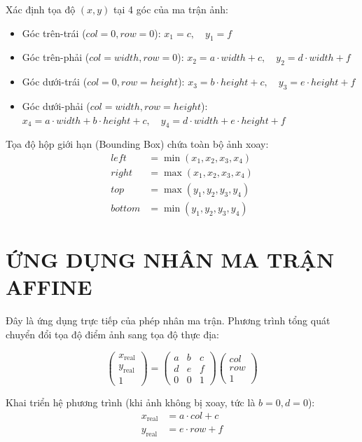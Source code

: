 \documentclass[12pt,a4paper]{report}
\begin{document}
Xác định tọa độ $(x, y)$ tại 4 góc của ma trận ảnh:
\begin{itemize}
    \item Góc trên-trái ($col=0, row=0$): $x_1 = c, \quad y_1 = f$
    \item Góc trên-phải ($col=width, row=0$): $x_2 = a \cdot width + c, \quad y_2 = d \cdot width + f$
    \item Góc dưới-trái ($col=0, row=height$): $x_3 = b \cdot height + c, \quad y_3 = e \cdot height + f$
    \item Góc dưới-phải ($col=width, row=height$): $x_4 = a \cdot width + b \cdot height + c, \quad y_4 = d \cdot width + e \cdot height + f$
\end{itemize}

Tọa độ hộp giới hạn (Bounding Box) chứa toàn bộ ảnh xoay:
\begin{align*}
    left &= \min(x_1, x_2, x_3, x_4) \\
    right &= \max(x_1, x_2, x_3, x_4) \\
    top &= \max(y_1, y_2, y_3, y_4) \\
    bottom &= \min(y_1, y_2, y_3, y_4)
\end{align*}

\section{ỨNG DỤNG NHÂN MA TRẬN AFFINE}

Đây là ứng dụng trực tiếp của phép nhân ma trận. Phương trình tổng quát chuyển đổi tọa độ điểm ảnh sang tọa độ thực địa:

\begin{equation*}
\begin{pmatrix}
    x_{\text{real}} \\
    y_{\text{real}} \\
    1
\end{pmatrix}
=
\begin{pmatrix}
    a & b & c \\
    d & e & f \\
    0 & 0 & 1
\end{pmatrix}
\begin{pmatrix}
    col \\
    row \\
    1
\end{pmatrix}
\end{equation*}

Khai triển hệ phương trình (khi ảnh không bị xoay, tức là $b = 0, d = 0$):
\begin{align*}
    x_{\text{real}} &= a \cdot col + c \\
    y_{\text{real}} &= e \cdot row + f
\end{align*}
\end{document}
